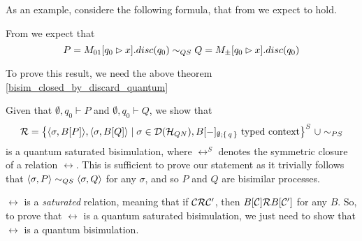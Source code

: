 As an example, considere the following formula, that from \cite{davidsonFormalVerificationTechniques2012} we expect to hold.
\begin{example}
From \cite{davidsonFormalVerificationTechniques2012} we expect that $$P =  M_{01}[q_0 \rhd x].disc(q_0) \sim_{QS} Q = M_\pm[q_0 \rhd x].disc(q_0)$$
\end{example}

To prove this result, we need the above theorem \ref{bisim_closed_by_discard_quantum}

Given that $\emptyset, {q_0} \vdash P$ and $\emptyset, {q_0} \vdash Q$, we show that
\[\mathcal{R} = \big\{ \langle\sigma, B[P]\rangle, \langle\sigma, B[Q]\rangle \mid \sigma \in \mathcal{D}(\mathcal{H}_{QN}), B[{-}]_{\emptyset; \set{q}} \text{ typed context}\big\}^S\ \cup \sim_{PS}
\]
is a quantum saturated bisimulation, where $\rel^S$ denotes the symmetric closure of a relation $\rel$. This is sufficient to prove our statement as it trivially follows that $\langle\sigma, P\rangle \sim_{QS} \langle\sigma, Q\rangle$ for any $\sigma$, and so $P$ and $Q$ are bisimilar processes.

$\rel$ is a \textit{saturated} relation, meaning that if $\mathcal{C} \mathcal{R} \mathcal{C}'$, then $B[\mathcal{C}] \mathcal{R} B[\mathcal{C}']$ for any $B$. So, to prove that $\rel$ is a quantum saturated bisimulation, we just need to show that $\rel$ is a quantum bisimulation.

